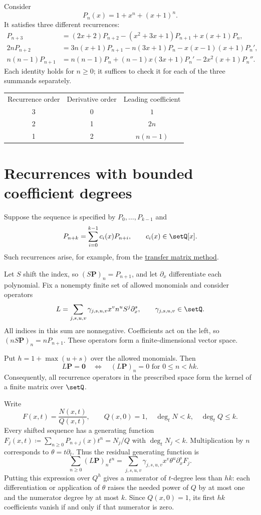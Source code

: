 Consider
\[
 P_n(x)=1+x^n+(x+1)^n.
\]
It satisfies three different recurrences:
\begin{align*}
 P_{n+3}
  &=(2x+2)P_{n+2}-(x^2+3x+1)P_{n+1}+x(x+1)P_n,\\
 2nP_{n+2}
  &=3n(x+1)P_{n+1}-n(3x+1)P_n-x(x-1)(x+1)P_n',\\
 n(n-1)P_{n+1}
  &=n(n-1)P_n+(n-1)x(3x+1)P_n'-2x^2(x+1)P_n''.
\end{align*}
Each identity holds for $n\geq0$; it suffices to check it for each of the
three summands separately.

\begin{tabular}{ccc}
 Recurrence order & Derivative order & Leading coefficient\\
 3 & 0 & $1$\\
 2 & 1 & $2n$\\
 1 & 2 & $n(n-1)$
\end{tabular}

\section[boundedRecurrenceSpaces]{Recurrences with bounded coefficient degrees}

Suppose the sequence is specified by $P_0,\dotsc,P_{k-1}$ and
\[
 P_{n+k}=\sum_{i=0}^{k-1}c_i(x)P_{n+i},\qquad c_i(x)\in\setQ[x].
\]
Such recurrences arise, for example, from the
\hyperref[transferMatrixMethod]{transfer matrix method}.

Let $S$ shift the index, so $(S\mathbf{P})_n=P_{n+1}$, and let
$\partial_x$ differentiate each polynomial. Fix a nonempty finite set of allowed
monomials and consider operators
\[
 L=\sum_{j,s,u,v}\gamma_{j,s,u,v}x^v n^u S^j\partial_x^s,
 \qquad \gamma_{j,s,u,v}\in\setQ.
\]
All indices in this sum are nonnegative. Coefficients act on the left, so
$(nS\mathbf{P})_n=nP_{n+1}$. These operators form a finite-dimensional vector space.

\begin{theorem}
\label{recurrenceFiniteVerification}
Put $h=1+\max(u+s)$ over the allowed monomials. Then
\[
 L\mathbf{P}=\mathbf{0}
 \quad\Longleftrightarrow\quad
 (L\mathbf{P})_n=0\text{ for }0\leq n<hk.
\]
Consequently, all recurrence operators in the prescribed space form the
kernel of a finite matrix over $\setQ$.
\end{theorem}

\begin{proof*}
Write
\[
 F(x,t)=\frac{N(x,t)}{Q(x,t)},
 \qquad Q(x,0)=1,\quad \deg_tN<k,\quad\deg_tQ\leq k.
\]
Every shifted sequence has a generating function
$F_j(x,t)\coloneqq\sum_{n\geq0}P_{n+j}(x)t^n=N_j/Q$ with
$\deg_tN_j<k$. Multiplication by $n$ corresponds to
$\theta=t\partial_t$. Thus the residual generating function is
\[
 \sum_{n\geq0}(L\mathbf{P})_nt^n
 =\sum_{j,s,u,v}\gamma_{j,s,u,v}x^v\theta^u\partial_x^sF_j.
\]
Putting this expression over $Q^h$ gives a numerator of $t$-degree less than
$hk$: each differentiation or application of $\theta$ raises the needed
power of $Q$ by at most one and the numerator degree by at most $k$.
Since $Q(x,0)=1$, its first $hk$ coefficients vanish if and only if that
numerator is zero.
\end{proof*}

